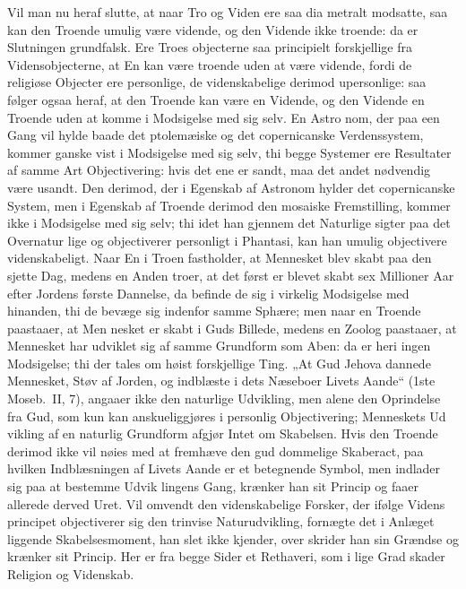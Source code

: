 \documentclass[12pt,a4paper]{article}
\newcommand{\opage}[1]{\marginnote{\footnotesize\textit{[#1]}}}
\begin{document}
Vil man nu heraf slutte, at naar Tro og Viden ere saa dia\-%
metralt modsatte, saa kan den Troende umulig være vidende, og
den Vidende ikke troende: da er Slutningen grundfalsk. Ere Troes\-%
objecterne saa principielt forskjellige fra Vidensobjecterne, at En
kan være troende uden at være vidende, fordi de religiøse Objecter
ere personlige, de videnskabelige derimod upersonlige: saa følger
ogsaa heraf, at den Troende kan være en Vidende, og den Vidende
en Troende uden at komme i Modsigelse med sig selv. En Astro\-%
nom, der paa een Gang vil hylde baade det ptolemæiske og det
copernicanske Verdenssystem, kommer ganske vist i Modsigelse
med sig selv, thi begge Systemer ere Resultater af samme Art
Objectivering: hvis det ene er sandt, maa det andet nødvendig
være usandt. Den derimod, der i Egenskab af Astronom hylder
det copernicanske System, men i Egenskab af Troende derimod
den mosaiske Fremstilling, kommer ikke i Modsigelse med sig
selv; thi idet han gjennem det Naturlige sigter paa det Overnatur\-%
lige og objectiverer personligt i Phantasi, kan han umulig objectivere
videnskabeligt. Naar En i Troen fastholder, at Mennesket blev skabt
paa den sjette Dag, medens en Anden troer, at det først er blevet
skabt sex Millioner Aar efter Jordens første Dannelse, da befinde
de sig i virkelig Modsigelse med hinanden, thi de bevæge sig
indenfor samme Sphære; men naar en Troende paastaaer, at Men\-%
nesket er skabt i Guds Billede, medens en Zoolog paastaaer, at
Mennesket har udviklet sig af samme Grundform som Aben: da
er heri ingen Modsigelse; thi der tales om høist forskjellige Ting.
„At Gud Jehova dannede Mennesket, Støv af Jorden, og indblæste
i dets Næseboer Livets Aande“ (1ste Moseb.\ II, 7), angaaer ikke
den naturlige Udvikling, men alene den Oprindelse fra Gud, som
kun kan anskueliggjøres i personlig Objectivering; Menneskets Ud\-%
vikling af en naturlig Grundform afgjør Intet om Skabelsen. Hvis
den Troende derimod ikke vil nøies med at fremhæve den gud\-%
\opage{53}dommelige Skaberact, paa hvilken Indblæsningen af Livets Aande
er et betegnende Symbol, men indlader sig paa at bestemme Udvik\-%
lingens Gang, krænker han sit Princip og faaer allerede derved
Uret. Vil omvendt den videnskabelige Forsker, der ifølge Videns\-%
principet objectiverer sig den trinvise Naturudvikling, fornægte det
i Anlæget liggende Skabelsesmoment, han slet ikke kjender, over\-%
skrider han sin Grændse og krænker sit Princip. Her er fra
begge Sider et Rethaveri, som i lige Grad skader Religion og
Videnskab.
\end{document}
